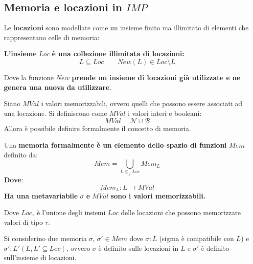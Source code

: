 \documentclass[a4paper]{article}
\begin{document}
 	\subsection{Memoria e locazioni in $IMP$}
 	
 	Le \textbf{locazioni} sono modellate come un insieme finito ma illimitato di elementi che rappresentano celle di memoria:
 	\begin{boxdef}
 		\textbf{L'insieme} $Loc$ \textbf{è una collezione illimitata di locazioni:}
 		\begin{equation*}
 			L \subseteq Loc \hspace{2em} New\left(L\right) \in Loc \setminus L
 		\end{equation*}
 	\end{boxdef}
 	
 	\noindent
 	Dove la funzione $New$ \textbf{prende un insieme di locazioni già utilizzate e ne genera una nuova da utilizzare}.\newline
 	
 	\noindent
 	Siano $MVal$ i valori memorizzabili, ovvero quelli che possono essere associati ad una locazione. Si definiscono come $MVal$ i valori interi e booleani:
 	\begin{equation*}
 		MVal = \mathcal{N} \cup \mathcal{B}
 	\end{equation*}
 	Allora è possibile definire formalmente il concetto di memoria.
 	
 	\begin{boxdef}
 		Una \textcolor{Red3}{\textbf{memoria formalmente}} \textbf{è un elemento dello spazio di funzioni} $Mem$ definito da:
 		\begin{equation*}
 			Mem = \bigcup_{L\subseteq_{f} Loc} Mem_{L}
 		\end{equation*}
 		\textbf{Dove}:
 		\begin{equation*}
 			Mem_{L} : L \longrightarrow MVal
 		\end{equation*}
 		\textbf{Ha una metavariabile} $\sigma$ \textbf{e} $MVal$ \textbf{sono i valori memorizzabili.}
 	\end{boxdef}
 
 	\noindent
 	Dove $Loc_{\tau}$ è l'unione degli insiemi $Loc$ delle locazioni che possono memorizzare valori di tipo $\tau$.\newline
 	
 	\noindent
 	Si considerino due memoria $\sigma$, $\sigma' \in Mem$ dove $\sigma: L$ (sigma è compatibile con $L$) e $\sigma' : L' \left(L, L' \subseteq Loc\right)$, ovvero $\sigma$ è definito sulle locazioni in $L$ e $\sigma'$ è definito sull'insieme di locazioni.
 	
\end{document}
